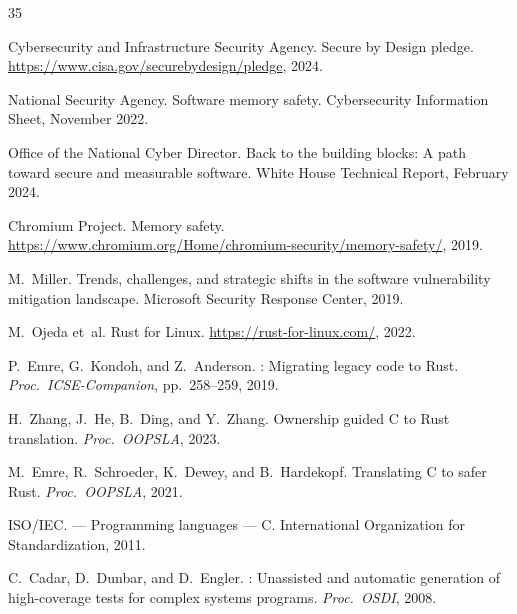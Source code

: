 \documentclass[10pt,a4paper]{article}
\begin{document}

\begin{thebibliography}{35}

Cybersecurity and Infrastructure Security Agency.
\newblock Secure by Design pledge.
\newblock \url{https://www.cisa.gov/securebydesign/pledge}, 2024.

National Security Agency.
\newblock Software memory safety.
\newblock Cybersecurity Information Sheet, November 2022.

Office of the National Cyber Director.
\newblock Back to the building blocks: A path toward secure and measurable software.
\newblock White House Technical Report, February 2024.

Chromium Project.
\newblock Memory safety.
\newblock \url{https://www.chromium.org/Home/chromium-security/memory-safety/}, 2019.

M.~Miller.
\newblock Trends, challenges, and strategic shifts in the software vulnerability mitigation landscape.
\newblock Microsoft Security Response Center, 2019.

M.~Ojeda et~al.
\newblock Rust for {Linux}.
\newblock \url{https://rust-for-linux.com/}, 2022.

P.~Emre, G.~Kondoh, and Z.~Anderson.
: Migrating legacy code to {Rust}.
\newblock \emph{Proc.\ ICSE-Companion}, pp.\ 258--259, 2019.

H.~Zhang, J.~He, B.~Ding, and Y.~Zhang.
\newblock Ownership guided {C} to {Rust} translation.
\newblock \emph{Proc.\ OOPSLA}, 2023.

M.~Emre, R.~Schroeder, K.~Dewey, and B.~Hardekopf.
\newblock Translating {C} to safer {Rust}.
\newblock \emph{Proc.\ OOPSLA}, 2021.

{ISO/IEC}.
 --- {P}rogramming languages --- {C}.
\newblock International Organization for Standardization, 2011.

C.~Cadar, D.~Dunbar, and D.~Engler.
: Unassisted and automatic generation of high-coverage tests for complex systems programs.
\newblock \emph{Proc.\ OSDI}, 2008.


\end{thebibliography}
\end{document}
